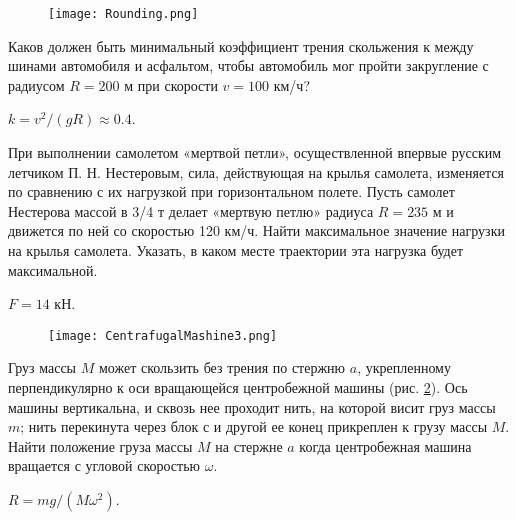 \begin{figure}[h]
\centering
\texttt{[image: Rounding.png]}
\caption{}
\label{Rounding}
\end{figure}

\begin{ex}  %
Каков должен быть минимальный коэффициент трения скольжения к между шинами автомобиля и асфальтом, чтобы автомобиль мог пройти закругление с радиусом $R = 200$ м при скорости $v = 100$ км/ч?
\begin{ans}
$k=v^2/(gR) \approx 0.4$.
\end{ans}
\end{ex}	

\begin{ex} %
При выполнении самолетом «мертвой петли», осуществленной впервые русским летчиком П. Н. Нестеровым, сила, действующая на крылья самолета, изменяется по сравнению с их нагрузкой при горизонтальном полете. Пусть самолет Нестерова массой в 3/4 т делает «мертвую петлю» радиуса $R = 235$ м и движется по ней со скоростью 120 км/ч. Найти максимальное значение нагрузки на крылья самолета. Указать, в каком месте траектории эта нагрузка будет максимальной.
\begin{ans}
$F = 14$ кН.
\end{ans}
\end{ex}	

\begin{ex} %

\begin{figure}[h]
\centering
\texttt{[image: CentrafugalMashine3.png]}
\caption{}
\label{CentrafugalMashine3}
\end{figure}

Груз массы $M$ может скользить без трения по стержню $a$, укрепленному перпендикулярно к оси вращающейся центробежной машины (рис. \ref{CentrafugalMashine3}). Ось машины вертикальна, и сквозь нее проходит нить, на которой висит груз массы $m$; нить перекинута через блок с и другой ее конец прикреплен к грузу массы $M$. Найти положение груза массы $M$ на стержне $a$ когда центробежная машина вращается с угловой скоростью $\omega$.
\begin{ans}
$R = mg/(M\omega^2)$.
\end{ans}
\end{ex}	

\complexProblems

